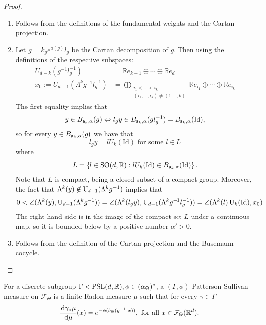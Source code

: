 \documentclass{report}
\begin{document}
\begin{proof}
    \begin{enumerate}[label=(\roman*)]
        \item Follows from the definitions of the fundamental weights and the Cartan projection.
        \item Let $g = k_g e^{a(g)} l_g$ be the Cartan decomposition of $g$.
        Then using the definitions of the respective subspaces:
        \begin{align*}
        U_{d-k}(g^{-1}l_g^{-1}) &= \mathbb R e_{k+1} \oplus \cdots \oplus \mathbb R e_d\\
        x_0 := U_{d-1}(\Lambda^k g ^{-1} l_g^{-1}) &= \bigoplus_{\substack{i_1 < \cdots < i_k\\(i_1, \cdots, i_k) \neq (1, \cdots, k)}}\mathbb R e_{i_1} \oplus \cdots \oplus \mathbb R e_{i_k}
        \end{align*}
        The first equality implies that
        \[
        y \in B_{{\sf a}_k, \alpha}(g) \Leftrightarrow l_g y \in B_{{\sf a}_k, \alpha}(g l_g^{-1}) = B_{{\sf a}_k, \alpha}(\mathrm{Id}),
        \]
        so for every $y \in B_{{\sf a}_k, \alpha}(g)$ we have that 
        \[
        l_g y = l U_k(\mathrm{Id}) \text{ for some } l \in L
        \]
        where
        \[
        L = \left\{ l \in \operatorname{{\mathrm{SO}}}(d, \mathbb R) : l U_k(\mathrm{Id}) \in B_{{\sf a}_k, \alpha}(\mathrm{Id}) \right\}.
        \]
        Note that $L$ is compact, being a closed subset of a compact group.
        Moreover, the fact that $\Lambda^k(y) \not \in \operatorname{{\mathrm{U}}}_{d-1}(\Lambda^k g^{-1})$ implies that
        \begin{align*}
            0 < \angle(\Lambda^k(y), \operatorname{{\mathrm{U}}}_{d-1}(\Lambda^k g^{-1})) =
            \angle(\Lambda^k(l_g y), \operatorname{{\mathrm{U}}}_{d-1}(\Lambda^k g^{-1} l_g^{-1})) = \angle(\Lambda^k(l) \operatorname{{\mathrm{U}}}_{k}(\mathrm{Id}), x_0)
        \end{align*}
        The right-hand side is in the image of the compact set $L$ under a continuous map, so it is bounded below by a positive number $\alpha' >0$.
        \item Follows from the definition of the Cartan projection and the Busemann cocycle.
    \end{enumerate}
\end{proof}
\begin{definition}
    For a discrete subgroup $\Gamma < \operatorname{{\mathrm{PSL}}}(d, \mathbb R), \phi \in (\alpha_\Theta)^*$,
    a $(\Gamma, \phi)$-Patterson Sullivan measure on $\mathcal F_\Theta$ is a finite Radon measure $\mu$ such that for every $\gamma \in \Gamma$
    \[
        \frac{\,\mathrm{d}\gamma_* \mu}{\,\mathrm{d}\mu}(x) = e^{-\phi(b_\Theta(g^{-1},x))}, \text{ for all } x \in \mathcal F_\Theta(\mathbb R^d).
    \]
\end{definition}
\end{document}
